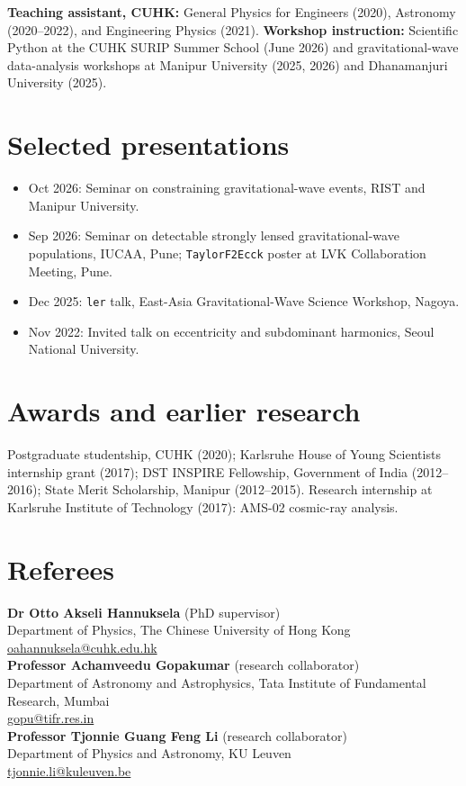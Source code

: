 \documentclass[10pt]{article}
\begin{document}
\textbf{Teaching assistant, CUHK:} General Physics for Engineers (2020), Astronomy (2020--2022), and Engineering Physics (2021). \textbf{Workshop instruction:} Scientific Python at the CUHK SURIP Summer School (June 2026) and gravitational-wave data-analysis workshops at Manipur University (2025, 2026) and Dhanamanjuri University (2025).
\section*{Selected presentations}
\begin{itemize}
\item Oct 2026: Seminar on constraining gravitational-wave events, RIST and Manipur University.
\item Sep 2026: Seminar on detectable strongly lensed gravitational-wave populations, IUCAA, Pune; \texttt{TaylorF2Ecck} poster at LVK Collaboration Meeting, Pune.
\item Dec 2025: \texttt{ler} talk, East-Asia Gravitational-Wave Science Workshop, Nagoya.
\item Nov 2022: Invited talk on eccentricity and subdominant harmonics, Seoul National University.
\end{itemize}
\section*{Awards and earlier research}
Postgraduate studentship, CUHK (2020); Karlsruhe House of Young Scientists internship grant (2017); DST INSPIRE Fellowship, Government of India (2012--2016); State Merit Scholarship, Manipur (2012--2015). Research internship at Karlsruhe Institute of Technology (2017): AMS-02 cosmic-ray analysis.
\section*{Referees}
\textbf{Dr Otto Akseli Hannuksela} (PhD supervisor)\\
Department of Physics, The Chinese University of Hong Kong\\
\href{mailto:oahannuksela@cuhk.edu.hk}{oahannuksela@cuhk.edu.hk}\\[4pt]
\textbf{Professor Achamveedu Gopakumar} (research collaborator)\\
Department of Astronomy and Astrophysics, Tata Institute of Fundamental Research, Mumbai\\
\href{mailto:gopu@tifr.res.in}{gopu@tifr.res.in}\\[4pt]
\textbf{Professor Tjonnie Guang Feng Li} (research collaborator)\\
Department of Physics and Astronomy, KU Leuven\\
\href{mailto:tjonnie.li@kuleuven.be}{tjonnie.li@kuleuven.be}
\end{document}
